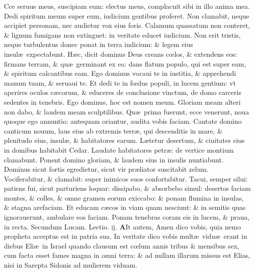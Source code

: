 \documentclass[a5paper,10pt]{book}
\def\leftmarginnote{%
	\lrmarginnote{\hskip -\marginparsep \hskip -6.5em}}
\def\rightmarginnote{%
	\lrmarginnote{\hskip\columnwidth \hskip -1em}}
\def\ae{æ}
\def\oe{œ}
\begin{document}
\begin{multicols*}{2}
\vspace{-.25em}
Cce\leftmarginnote{\begin{flushright}c. 42.\end{flushright}} seruus meus, suscipiam eum: electus meus, complacuit sibi in illo anima mea.
Dedi spiritum meum super eum, iudicium gentibus proferet.
Non clamabit, neque accipiet personam, nec audietur vox eius foris.
Calamum quassatum non conteret, \& lignum fumigans non extinguet: in veritate educet iudicium.
Non erit tristis, neque turbulentus donec ponat in terra iudicium: \& legem eius insul\ae \ expectabunt.
H\ae c, dicit dominus Deus creans c\oe los, \& extendens eos: firmans terram, \& qu\ae \ germinant ex ea: dans flatum populo, qui est super eam, \& spiritum calcantibus eam.
Ego dominus vocaui te in iustitia, \& apprehendi manum tuam, \& seruaui te.
Et dedi te in f\oe dus populi, in lucem gentium: vt aperires oculos c\ae corum, \& educeres de conclusione vinctum, de domo carceris sedentes in tenebris.
Ego dominus, hoc est nomen meum. Gloriam meam alteri non dabo, \& laudem meam sculptilibus.
Qu\ae \ prima fuerunt, ecce
venerunt, noua quoque ego annuntio: antequam oriantur, audita vobis faciam.
Cantate domino canticum nouum, laus eius ab extremis terr\ae , qui descenditis in mare, \& plenitudo eius, insul\ae , \& habitatores earum.
L\ae tetur desertum, \& ciuitates eius in domibus habitabit Cedar.
Laudate habitatores petr\ae : de vertice montium clamabunt.
Ponent domino gloriam, \& laudem eius in insulis nuntiabunt.
Dominus sicut fortis egredietur, sicut vir pr\ae liator suscitabit zelum.
Vociferabitur, \& clamabit: super inimicos suos confortabitur.
Tacui, semper silui: patiens fui, sicut parturiens loquar: dissipabo, \& absorbebo simul: desertos faciam montes, \& colles, \& omne gramen eorum exiccabo: \& ponam flumina in insulas, \& stagna arefaciam.
Et educam c\ae cos in viam quam nesciunt: \& in semitis quas ignorauerunt, ambulare eos faciam.
Ponam tenebras coram eis in lucem, \& praua, in recta.
\newline \color{red} Secundum Lucam. \hfill Lectio. ij. \color{black}
\vspace{-.25em}
\lettrine[lines=2]{\bfseries \color{red} A}{}It\rightmarginnote{c.4.c} autem, Amen dico vobis, quia nemo propheta acceptus est in patria sua.
In veritate dico vobis mult\ae \ vidu\ae \ erant in diebus Eli\ae \ in Israel quando clausum est c\oe lum annis tribus \& mensibus sex, cum facta esset fames magna in omni terra: \& ad nullam illarum missus est Elias, nisi in Sarepta Sidonis ad mulierem viduam.

\end{multicols*}
\end{document}
